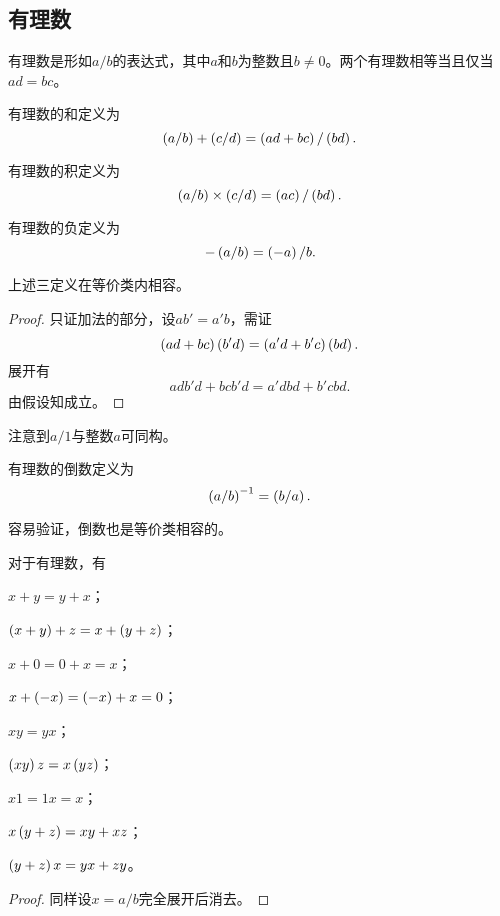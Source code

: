 \documentclass{ctexrep}
\begin{document}
  \subsection{有理数}
  \begin{definition}
    有理数是形如$a/b$的表达式，其中$a$和$b$为整数且$b\ne 0$。两个有理数相等当且仅当$ad=bc$。
  \end{definition}
  \begin{definition}
    有理数的和定义为
    \[ \left(a/b\right)+\left(c/d\right) = \left(ad+bc\right)/\left(bd\right). \]
  \end{definition}
  \begin{definition}
    有理数的积定义为
    \[ \left(a/b\right)\times\left(c/d\right) = \left(ac\right)/\left(bd\right). \]
  \end{definition}
  \begin{definition}
    有理数的负定义为
    \[ -\left(a/b\right)=\left(-a\right)/b. \]
  \end{definition}
  \begin{theorem}
    上述三定义在等价类内相容。
  \end{theorem}
  \begin{proof}
    只证加法的部分，设$ab'=a'b$，需证
    \[ \left(ad+bc\right)\left(b'd\right) = \left(a'd+b'c\right)\left(bd\right). \]
    展开有
    \[ adb'd + bcb'd = a'dbd + b'cbd. \]
    由假设知成立。
  \end{proof}
  注意到$a/1$与整数$a$可同构。
  \begin{definition}
    有理数的倒数定义为
    \[ \left(a/b\right)^{-1} = \left(b/a\right). \]
  \end{definition}
  容易验证，倒数也是等价类相容的。
  \begin{theorem}
    对于有理数，有
    \begin{aenum}
      \item $x+y = y+x$；
      \item $\left(x+y\right)+z = x+\left(y+z\right)$；
      \item $x+0 = 0+x = x$；
      \item $x+\left(-x\right)=\left(-x\right)+x=0$；
      \item $xy=yx$；
      \item $\left(xy\right)z=x\left(yz\right)$；
      \item $x1=1x=x$；
      \item $x\left(y+z\right) = xy + xz$；
      \item $\left(y+z\right)x = yx+zy$。
    \end{aenum}
  \end{theorem}
  \begin{proof}
    同样设$x=a/b$完全展开后消去。
  \end{proof}
\end{document}
